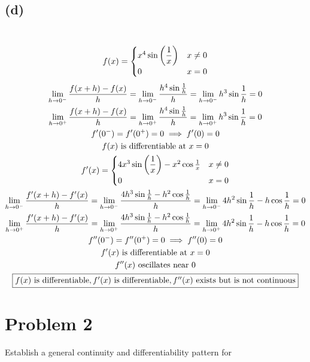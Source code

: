 \documentclass[12pt]{article}
\newcommand*{\paren}[1]{\ensuremath\left(#1\right)}
\newcommand{\vem}{\vspace{0.5em}}
\newcommand{\problem}[1]{\section{Problem #1}}
\newcommand{\subproblem}[1]{\subsection{(#1)} \,}
\begin{document}
\subproblem{d}
\[
f(x)=\begin{cases}
    x^4 \sin \paren{\dfrac{1}{x}} &x\ne 0\\
    0 &x=0
\end{cases}
\]
\begin{gather*}
    \lim_{h \to 0^-} \frac{f(x+h)-f(x)}{h}=\lim_{h \to 0^-}\frac{h^4 \sin \frac{1}{h}}{h}=\lim_{h \to 0^-}h^3 \sin \frac{1}{h}=0\\
    \lim_{h \to 0^+} \frac{f(x+h)-f(x)}{h}=\lim_{h \to 0^+}\frac{h^4 \sin \frac{1}{h}}{h}=\lim_{h \to 0^+}h^3 \sin \frac{1}{h}=0\\
    f'(0^-)=f'(0^+)=0 \implies f'(0)=0\\
    f(x) $ is differentiable at $ x=0\\
    f'(x)=\begin{cases}
        4x^3 \sin \paren{\dfrac{1}{x}} -x^2 \cos \frac{1}{x} &x\ne 0\\
    0 &x=0
    \end{cases}\\
    \lim_{h \to 0^-} \frac{f'(x+h)-f'(x)}{h}=\lim_{h \to 0^-}\frac{4h^3 \sin \frac{1}{h} -h^2\cos\frac{1}{h}}{h}=\lim_{h \to 0^-} 4h^2 \sin \frac{1}{h}-h \cos \frac{1}{h}=0\\
    \lim_{h \to 0^+} \frac{f'(x+h)-f'(x)}{h}=\lim_{h \to 0^+}\frac{4h^3 \sin \frac{1}{h} -h^2\cos\frac{1}{h}}{h}=\lim_{h \to 0^+} 4h^2 \sin \frac{1}{h}-h \cos \frac{1}{h}=0\\
    f''(0^-)=f''(0^+)=0 \implies f''(0)=0\\
    f'(x)$ is differentiable at $ x=0\\
    f''(x)$ oscillates near 0$\\
\boxed{f(x) $ is differentiable$,
    f'(x) $ is differentiable$,
    f''(x) $ exists but is not continuous$}
\end{gather*}

\problem{2}
Establish a general continuity and differentiability pattern for \vem
\end{document}
